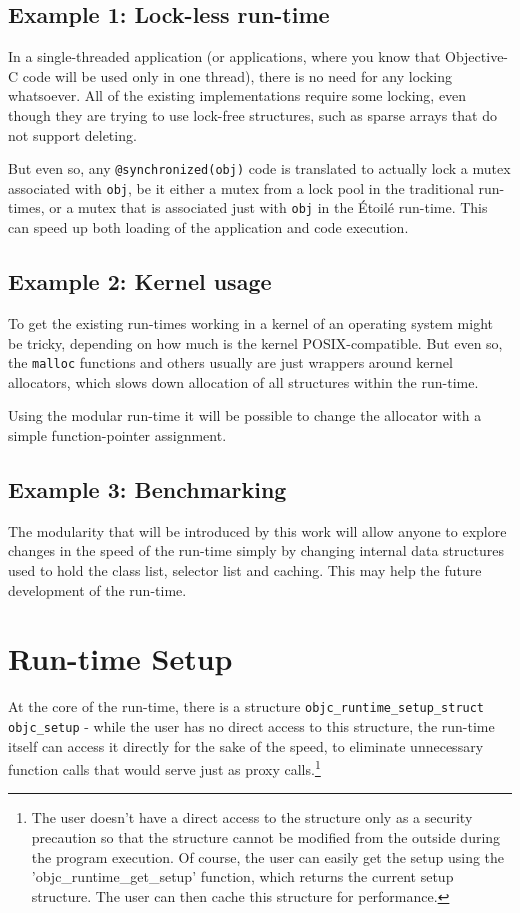 \subsection{Example 1: Lock-less run-time}
In a single-threaded application (or applications, where you know that Objective-C code will be used only in one thread), there is no need for any locking whatsoever. All of the existing implementations require some locking, even though they are trying to use lock-free structures, such as sparse arrays that do not support deleting.

But even so, any \verb=@synchronized(obj)= code is translated to actually lock a mutex associated with \verb=obj=, be it either a mutex from a lock pool in the traditional run-times, or a mutex that is associated just with \verb=obj= in the \'Etoil\'e run-time. This can speed up both loading of the application and code execution.

\subsection{Example 2: Kernel usage}

To get the existing run-times working in a kernel of an operating system might be tricky, depending on how much is the kernel POSIX-compatible. But even so, the \verb=malloc= functions and others usually are just wrappers around kernel allocators, which slows down allocation of all structures within the run-time.

Using the modular run-time it will be possible to change the allocator with a simple function-pointer assignment.


\subsection{Example 3: Benchmarking}

The modularity that will be introduced by this work will allow anyone to explore changes in the speed of the run-time simply by changing internal data structures used to hold the class list, selector list and caching. This may help the future development of the run-time.


\section{Run-time Setup}

At the core of the run-time, there is a structure \verb=objc_runtime_setup_struct objc_setup= - while the user has no direct access to this structure, the run-time itself can access it directly for the sake of the speed, to eliminate unnecessary function calls that would serve just as proxy calls.\footnote{The user doesn't have a direct access to the structure only as a security precaution so that the structure cannot be modified from the outside during the program execution. Of course, the user can easily get the setup using the 'objc\_runtime\_get\_setup' function, which returns the current setup structure. The user can then cache this structure for performance.}

